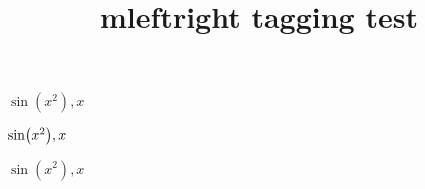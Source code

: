 \documentclass{article}
\title{mleftright tagging test}
\begin{document}
$\sin\left(x^2\right), x$

$\sin\mleft(x^2\mright), x$

\mleftright

$\sin\left(x^2\right), x$
\end{document}
